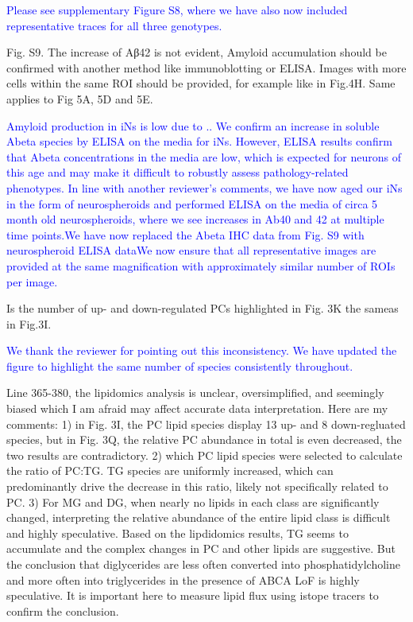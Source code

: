 \textcolor{blue}{Please see supplementary Figure S8, where we have also now included representative traces for all three genotypes.}

Fig. S9. The increase of Aβ42 is not evident, Amyloid accumulation should be confirmed with another method like immunoblotting or ELISA. Images with more cells within the same ROI should be provided, for example like in Fig.4H. Same applies to Fig 5A, 5D and 5E.

\textcolor{blue}{Amyloid production in iNs is low due to .. We confirm an increase in soluble Abeta species by ELISA on the media for iNs. However, ELISA results confirm that Abeta concentrations in the media are low, which is expected for neurons of this age and may make it difficult to robustly assess pathology-related phenotypes. In line with another reviewer’s comments, we have now aged our iNs in the form of neurospheroids and performed ELISA on the media of circa 5 month old neurospheroids, where we see increases in Ab40 and 42 at multiple time points.We have now replaced the Abeta IHC data from Fig. S9 with neurospheroid ELISA dataWe now ensure that all representative images are provided at the same magnification with approximately similar number of ROIs per image.}

Is the number of up- and down-regulated PCs highlighted in Fig. 3K the sameas in Fig.3I.

\textcolor{blue}{We thank the reviewer for pointing out this inconsistency. We have updated the figure to highlight the same number of species consistently throughout.}

Line 365-380, the lipidomics analysis is unclear, oversimplified, and seemingly biased which I am afraid may affect accurate data interpretation. Here are my comments: 1) in Fig. 3I, the PC lipid species display 13 up- and 8 down-regluated species, but in Fig. 3Q, the relative PC abundance in total is even decreased, the two results are contradictory. 2) which PC lipid species were selected to calculate the ratio of PC:TG. TG species are uniformly increased, which can predominantly drive the decrease in this ratio, likely not specifically related to PC. 3) For MG and DG, when nearly no lipids in each class are significantly changed, interpreting the relative abundance of the entire lipid class is difficult and highly speculative. Based on the lipdidomics results, TG seems to accumulate and the complex changes in PC and other lipids are suggestive. But the conclusion that diglycerides are less often converted into phosphatidylcholine and more often into triglycerides in the presence of ABCA LoF is highly speculative. It is important here to measure lipid flux using istope tracers to confirm the conclusion.


